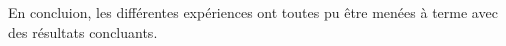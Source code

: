 En concluion, les différentes expériences ont toutes pu être menées à terme avec des résultats concluants.
